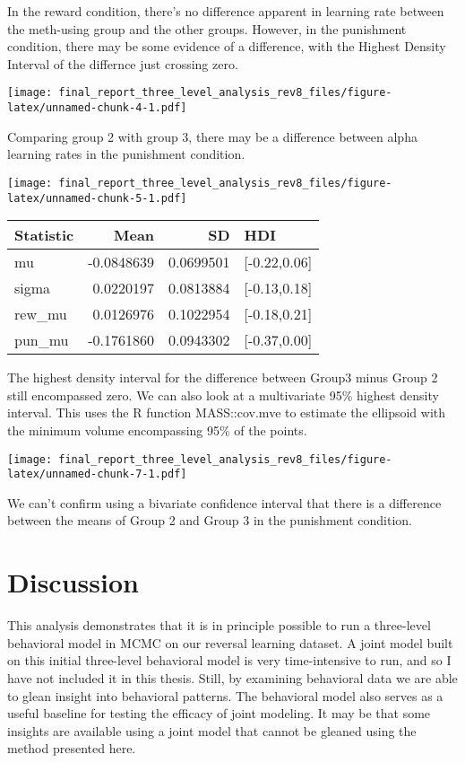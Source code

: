 \documentclass[]{article}
\begin{document}
In the reward condition, there's no difference apparent in learning rate
between the meth-using group and the other groups. However, in the
punishment condition, there may be some evidence of a difference, with
the Highest Density Interval of the differnce just crossing zero.

\texttt{[image: final\_report\_three\_level\_analysis\_rev8\_files/figure-latex/unnamed-chunk-4-1.pdf]}

Comparing group 2 with group 3, there may be a difference between alpha
learning rates in the punishment condition.

\texttt{[image: final\_report\_three\_level\_analysis\_rev8\_files/figure-latex/unnamed-chunk-5-1.pdf]}

\begin{longtable}[]{@{}lrrl@{}}
\toprule
Statistic & Mean & SD & HDI\tabularnewline
\midrule
\endhead
mu & -0.0848639 & 0.0699501 & {[}-0.22,0.06{]}\tabularnewline
sigma & 0.0220197 & 0.0813884 & {[}-0.13,0.18{]}\tabularnewline
rew\_mu & 0.0126976 & 0.1022954 & {[}-0.18,0.21{]}\tabularnewline
pun\_mu & -0.1761860 & 0.0943302 & {[}-0.37,0.00{]}\tabularnewline
\bottomrule
\end{longtable}

The highest density interval for the difference between Group3 minus
Group 2 still encompassed zero. We can also look at a multivariate 95\%
highest density interval. This uses the R function
\textbar{}MASS::cov.mve\textbar{} to estimate the ellipsoid with the
minimum volume encompassing 95\% of the points.

\texttt{[image: final\_report\_three\_level\_analysis\_rev8\_files/figure-latex/unnamed-chunk-7-1.pdf]}

We can't confirm using a bivariate confidence interval that there is a
difference between the means of Group 2 and Group 3 in the punishment
condition.

\section{Discussion}\label{discussion}

This analysis demonstrates that it is in principle possible to run a
three-level behavioral model in MCMC on our reversal learning dataset. A
joint model built on this initial three-level behavioral model is very
time-intensive to run, and so I have not included it in this thesis.
Still, by examining behavioral data we are able to glean insight into
behavioral patterns. The behavioral model also serves as a useful
baseline for testing the efficacy of joint modeling. It may be that some
insights are available using a joint model that cannot be gleaned using
the method presented here.
\end{document}
